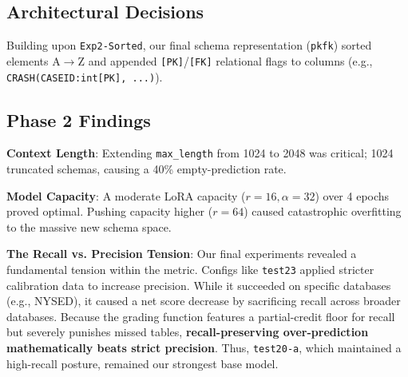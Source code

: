 \documentclass[10pt,twocolumn]{article}
\begin{document}
\subsection{Architectural Decisions}
Building upon \texttt{Exp2-Sorted}, our final schema representation (\texttt{pkfk}) sorted elements A$\to$Z and appended \texttt{[PK]}/\texttt{[FK]} relational flags to columns (e.g., \texttt{CRASH(CASEID:int[PK], ...)}).

\begin{table}[h]
\centering
\caption{Selected Round 2 Results with Augmentation.}
\label{tab:r2}
\end{table}

\subsection{Phase 2 Findings}
\textbf{Context Length}: Extending \texttt{max\_length} from 1024 to 2048 was critical; 1024 truncated schemas, causing a 40\% empty-prediction rate. 

\textbf{Model Capacity}: A moderate LoRA capacity ($r{=}16, \alpha{=}32$) over 4 epochs proved optimal. Pushing capacity higher ($r{=}64$) caused catastrophic overfitting to the massive new schema space.

\textbf{The Recall vs. Precision Tension}: 
Our final experiments revealed a fundamental tension within the metric. Configs like \texttt{test23} applied stricter calibration data to increase precision. While it succeeded on specific databases (e.g., NYSED), it caused a net score decrease by sacrificing recall across broader databases. Because the grading function features a partial-credit floor for recall but severely punishes missed tables, \textbf{recall-preserving over-prediction mathematically beats strict precision}. Thus, \texttt{test20-a}, which maintained a high-recall posture, remained our strongest base model.
\end{document}

